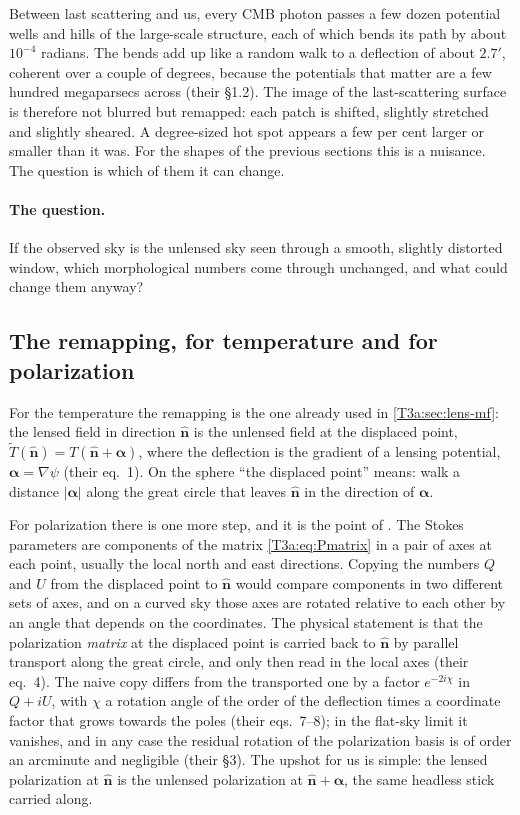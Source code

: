 Between last scattering and us, every CMB photon passes a few dozen potential wells and hills of the large-scale structure, each of which bends its path by about $10^{-4}$ radians. The bends add up like a random walk to a deflection of about $2.7'$, coherent over a couple of degrees, because the potentials that matter are a few hundred megaparsecs across \cite{LewisChallinor2006} (their \S1.2). The image of the last-scattering surface is therefore not blurred but remapped: each patch is shifted, slightly stretched and slightly sheared. A degree-sized hot spot appears a few per cent larger or smaller than it was. For the shapes of the previous sections this is a nuisance. The question is which of them it can change.

\paragraph{The question.} If the observed sky is the unlensed sky seen through a smooth, slightly distorted window, which morphological numbers come through unchanged, and what could change them anyway?

\subsection{The remapping, for temperature and for polarization}
\label{T3a:sec:remap}

For the temperature the remapping is the one already used in \cref{T3a:sec:lens-mf}: the lensed field in direction $\hat{\bm n}$ is the unlensed field at the displaced point, $\tilde T(\hat{\bm n})=T(\hat{\bm n}+\bm\alpha)$, where the deflection is the gradient of a lensing potential, $\bm\alpha=\nabla\psi$ \cite{ChallinorChon2002} (their eq.~1). On the sphere ``the displaced point'' means: walk a distance $|\bm\alpha|$ along the great circle that leaves $\hat{\bm n}$ in the direction of $\bm\alpha$.

For polarization there is one more step, and it is the point of \cite{ChallinorChon2002}. The Stokes parameters are components of the matrix \eqref{T3a:eq:Pmatrix} in a pair of axes at each point, usually the local north and east directions. Copying the numbers $Q$ and $U$ from the displaced point to $\hat{\bm n}$ would compare components in two different sets of axes, and on a curved sky those axes are rotated relative to each other by an angle that depends on the coordinates. The physical statement is that the polarization \emph{matrix} at the displaced point is carried back to $\hat{\bm n}$ by parallel transport along the great circle, and only then read in the local axes (their eq.~4). The naive copy differs from the transported one by a factor $e^{-2i\chi}$ in $Q+iU$, with $\chi$ a rotation angle of the order of the deflection times a coordinate factor that grows towards the poles (their eqs.~7--8); in the flat-sky limit it vanishes, and in any case the residual rotation of the polarization basis is of order an arcminute and negligible \cite{LewisChallinor2006} (their \S3). The upshot for us is simple: the lensed polarization at $\hat{\bm n}$ is the unlensed polarization at $\hat{\bm n}+\bm\alpha$, the same headless stick carried along.

